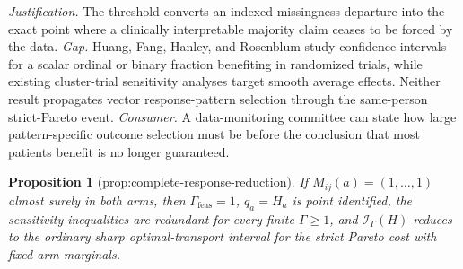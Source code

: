 \documentclass{article}
\newtheorem{proposition}{Proposition}
\begin{document}
\par\smallskip\noindent \textit{Justification.} The threshold converts an indexed missingness departure into the exact point where a clinically interpretable majority claim ceases to be forced by the data. \textit{Gap.} Huang, Fang, Hanley, and Rosenblum study confidence intervals for a scalar ordinal or binary fraction benefiting in randomized trials, while existing cluster-trial sensitivity analyses target smooth average effects. Neither result propagates vector response-pattern selection through the same-person strict-Pareto event. \textit{Consumer.} A data-monitoring committee can state how large pattern-specific outcome selection must be before the conclusion that most patients benefit is no longer guaranteed.

\begin{proposition}[prop:complete-response-reduction]\label{prop:complete-response-reduction}
If \(M_{ij}(a)=(1,\ldots,1)\) almost surely in both arms, then \(\Gamma_{\mathrm{feas}}=1\), \(q_a=H_a\) is point identified, the sensitivity inequalities are redundant for every finite \(\Gamma\ge1\), and \(\mathcal I_{\Gamma}(H)\) reduces to the ordinary sharp optimal-transport interval for the strict Pareto cost with fixed arm marginals.
\end{proposition}
\end{document}
